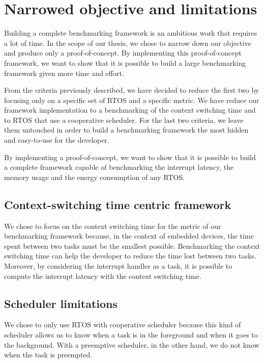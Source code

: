 \section{Narrowed objective and limitations}

Building a complete benchmarking framework is an ambitious work that requires a lot of time.
In the scope of our thesis, we chose to narrow down our objective and produce only a proof-of-concept.
By implementing this proof-of-concept framework, we want to show that it is possible to build a large benchmarking framework given more time and effort.

From the criteria previously described, we have decided to reduce the first two by focusing only on a specific set of RTOS and a specific metric.
We have reduce our framework implementation to a benchmarking of the context switching time and to RTOS that use a cooperative scheduler.
For the last two criteria, we leave them untouched in order to build a benchmarking framework the most hidden and easy-to-use for the developer.

By implementing a proof-of-concept, we want to show that it is possible to build a complete framework capable of benchmarking the interrupt latency, the memory usage and the energy consumption of any RTOS.

\subsection{Context-switching time centric framework}

We chose to focus on the context switching time for the metric of our benchmarking framework because, in the context of embedded devices, the time spent between two tasks must be the smallest possible.
Benchmarking the context switching time can help the developer to reduce the time lost between two tasks.
Moreover, by considering the interrupt handler as a task, it is possible to compute the interrupt latency with the context switching time.

\subsection{Scheduler limitations}

We chose to only use RTOS with cooperative scheduler because this kind of scheduler allows us to know when a task is in the foreground and when it goes to the background.
With a preemptive scheduler, in the other hand, we do not know when the task is preempted.


